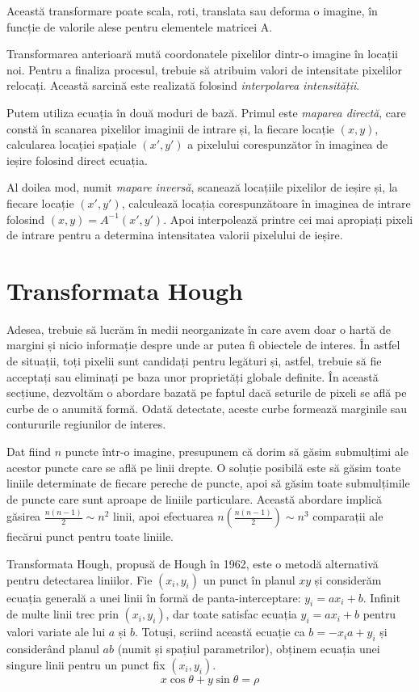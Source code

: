 \documentclass[a4paper,12pt]{report}
\begin{document}
Această transformare poate scala, roti, translata sau deforma o imagine, în funcție de valorile alese pentru elementele matricei A.

Transformarea anterioară mută coordonatele pixelilor dintr-o imagine în locații noi. Pentru a finaliza procesul, trebuie să atribuim valori de intensitate pixelilor relocați. Această sarcină este realizată folosind \textit{interpolarea intensității}.

Putem utiliza ecuația în două moduri de bază. Primul este \textit{maparea directă}, care constă în scanarea pixelilor imaginii de intrare și, la fiecare locație $(x, y)$, calcularea locației spațiale $(x', y')$ a pixelului corespunzător în imaginea de ieșire folosind direct ecuația.

Al doilea mod, numit \textit{mapare inversă}, scanează locațiile pixelilor de ieșire și, la fiecare locație $(x', y')$, calculează locația corespunzătoare în imaginea de intrare folosind $(x, y) = A^{-1}(x', y')$. Apoi interpolează printre cei mai apropiați pixeli de intrare pentru a determina intensitatea valorii pixelului de ieșire.

\section{Transformata Hough}
Adesea, trebuie să lucrăm în medii neorganizate în care avem doar o hartă de margini și nicio informație despre unde ar putea fi obiectele de interes. În astfel de situații, toți pixelii sunt candidați pentru legături și, astfel, trebuie să fie acceptați sau eliminați pe baza unor proprietăți globale definite. În această secțiune, dezvoltăm o abordare bazată pe faptul dacă seturile de pixeli se află pe curbe de o anumită formă. Odată detectate, aceste curbe formează marginile sau contururile regiunilor de interes.

Dat fiind $n$ puncte într-o imagine, presupunem că dorim să găsim submulțimi ale acestor puncte care se află pe linii drepte. O soluție posibilă este să găsim toate liniile determinate de fiecare pereche de puncte, apoi să găsim toate submulțimile de puncte care sunt aproape de liniile particulare. Această abordare implică găsirea $\frac{n(n-1)}{2} \sim n^2$ linii, apoi efectuarea $n \left(\frac{n(n-1)}{2}\right) \sim n^3$ comparații ale fiecărui punct pentru toate liniile.

Transformata Hough, propusă de Hough în 1962, este o metodă alternativă pentru detectarea liniilor. Fie $(x_i, y_i)$ un punct în planul $xy$ și considerăm ecuația generală a unei linii în formă de panta-interceptare: $y_i = ax_i + b$. Infinit de multe linii trec prin $(x_i, y_i)$, dar toate satisfac ecuația $y_i = ax_i + b$ pentru valori variate ale lui $a$ și $b$. Totuși, scriind această ecuație ca $b = -x_i a + y_i$ și considerând planul $ab$ (numit și spațiul parametrilor), obținem ecuația unei singure linii pentru un punct fix $(x_i, y_i)$.
\[
    x \cos \theta + y \sin \theta = \rho
\]
\end{document}
